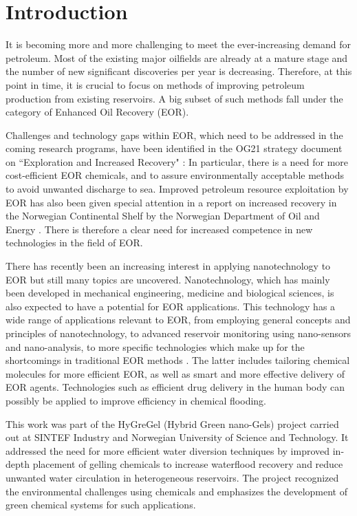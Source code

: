 \documentclass[nanomaterials,article,submit,moreauthors,pdftex]{Definitions/mdpi}
\begin{document}


\section{Introduction}
It is becoming more and more challenging to meet the ever-increasing demand for petroleum. Most of the existing major oilfields are already at a mature stage and the number of new significant discoveries per year is decreasing. Therefore, at this point in time, it is crucial to focus on methods of improving petroleum production from existing reservoirs. A big subset of such methods fall under the category of Enhanced Oil Recovery (EOR).

Challenges and technology gaps within EOR, which need to be addressed in the coming research programs, have been identified in the OG21 strategy document on ``Exploration and Increased Recovery" \citep{OG21}: In particular, there is a need for more cost-efficient EOR chemicals, and to assure environmentally acceptable methods to avoid unwanted discharge to sea. Improved petroleum resource exploitation by EOR has also been given special attention in a report on increased recovery in the Norwegian Continental Shelf by the Norwegian Department of Oil and Energy \citep{Am2010}. There is therefore a clear need for increased competence in new technologies in the field of EOR. 

There has recently been an increasing interest in applying nanotechnology to EOR but still many topics are uncovered. Nanotechnology, which has mainly been developed in mechanical engineering, medicine and biological sciences, is also expected to have a potential for EOR applications. This technology has a wide range of applications relevant to EOR, from employing general concepts and principles of nanotechnology, to advanced reservoir monitoring using nano-sensors and nano-analysis, to more specific technologies which make up for the shortcomings in traditional EOR methods \citep{Fletcher2010, Ayatollahi2012, Cocuzza2011}. The latter includes tailoring chemical molecules for more efficient EOR, as well as smart and more effective delivery of EOR agents. Technologies such as efficient drug delivery in the human body can possibly be applied to improve efficiency in chemical flooding.

This work was part of the HyGreGel (Hybrid Green nano-Gels) project carried out at SINTEF Industry and Norwegian University of Science and Technology. It addressed the need for more efficient water diversion techniques by improved in-depth placement of gelling chemicals to increase waterflood recovery and reduce unwanted water circulation in heterogeneous reservoirs. The project recognized the environmental challenges using chemicals and emphasizes the development of green chemical systems for such applications.
\end{document}
